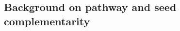 \documentclass[sn-mathphys,Numbered]{sn-jnl}  %
\theoremstyle{thmstyleone}%
\theoremstyle{thmstyletwo}%
\theoremstyle{thmstylethree}%
\begin{document}
\begin{appendices}

    \section{}













    \subsection*{Background on pathway and seed complementarity}
    \label{app:pathcompl}


\end{appendices}
\end{document}
